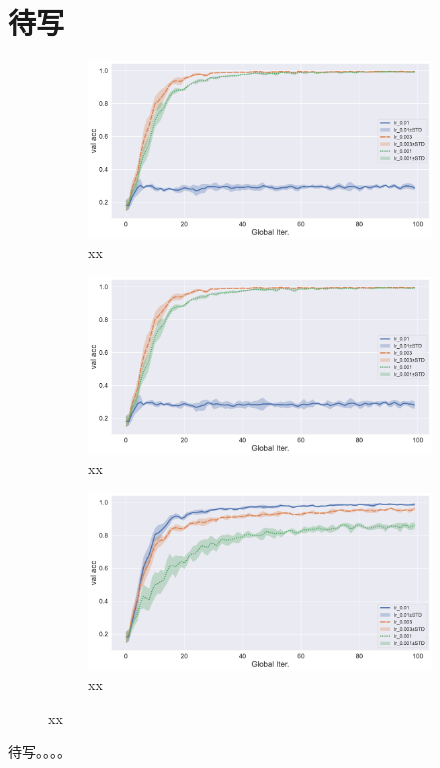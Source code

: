 \section{待写}
\label{sec:chap6-lr}


\begin{figure}[ht]
\centering
\begin{subfigure}{.5\textwidth}
  \centering
  \includegraphics[width=.95\linewidth]{figures/adam-sample-30-compare-lr-val-acc.pdf}
  \caption{xx}
  \label{fig:adam-sample-30-compare-lr-val-acc}
\end{subfigure}%
\begin{subfigure}{.5\textwidth}
  \centering
  \includegraphics[width=.95\linewidth]{figures/yogi-sample-30-compare-lr-val-acc.pdf}
  \caption{xx}
  \label{fig:yogi-sample-30-compare-lr-val-acc}
\end{subfigure}
\begin{subfigure}{.6\textwidth}
  \centering
  \includegraphics[width=.95\linewidth]{figures/adagrad-sample-30-compare-lr-val-acc.pdf}
  \caption{xx}
  \label{fig:adagrad-sample-30-compare-lr-val-acc}
\end{subfigure}
\caption{xx}
\label{fig:fedopt-sample-30-compare-lr-val-acc}
\end{figure}

待写。。。。
